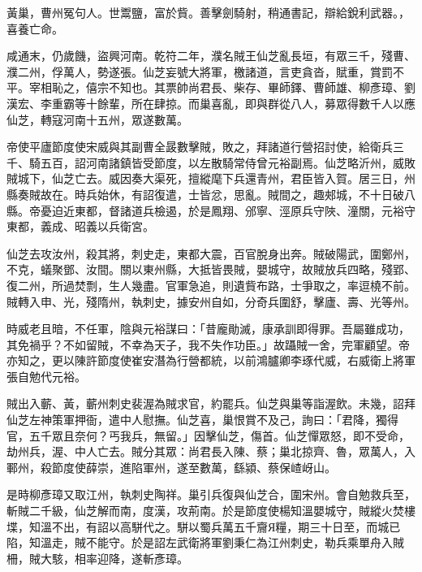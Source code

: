
\begin{pinyinscope}

 黃巢，曹州冤句人。世鬻鹽，富於貲。善擊劍騎射，稍通書記，辯給銳利武器。，喜養亡命。



 咸通末，仍歲饑，盜興河南。乾符二年，濮名賊王仙芝亂長垣，有眾三千，殘曹、濮二州，俘萬人，勢遂張。仙芝妄號大將軍，檄諸道，言吏貪沓，賦重，賞罰不平。宰相恥之，僖宗不知也。其票帥尚君長、柴存、畢師鐸、曹師雄、柳彥璋、劉漢宏、李重霸等十餘輩，所在肆掠。而巢喜亂，即與群從八人，募眾得數千人以應仙芝，轉寇河南十五州，眾遂數萬。



 帝使平廬節度使宋威與其副曹全晸數擊賊，敗之，拜諸道行營招討使，給衛兵三千、騎五百，詔河南諸鎮皆受節度，以左散騎常侍曾元裕副焉。仙芝略沂州，威敗賊城下，仙芝亡去。威因奏大渠死，擅縱麾下兵還青州，君臣皆入賀。居三日，州縣奏賊故在。時兵始休，有詔復遣，士皆忿，思亂。賊間之，趣郟城，不十日破八縣。帝憂迫近東都，督諸道兵檢遏，於是鳳翔、邠寧、涇原兵守陜、潼關，元裕守東都，義成、昭義以兵衛宮。



 仙芝去攻汝州，殺其將，刺史走，東都大震，百官脫身出奔。賊破陽武，圍鄭州，不克，蟻聚鄧、汝間。關以東州縣，大抵皆畏賊，嬰城守，故賊放兵四略，殘郢、復二州，所過焚剽，生人幾盡。官軍急追，則遺貲布路，士爭取之，率逗橈不前。賊轉入申、光，殘隋州，執刺史，據安州自如，分奇兵圍舒，擊廬、壽、光等州。



 時威老且暗，不任軍，陰與元裕謀曰：「昔龐勛滅，康承訓即得罪。吾屬雖成功，其免禍乎？不如留賊，不幸為天子，我不失作功臣。」故躡賊一舍，完軍顧望。帝亦知之，更以陳許節度使崔安潛為行營都統，以前鴻臚卿李琢代威，右威衛上將軍張自勉代元裕。



 賊出入蘄、黃，蘄州刺史裴渥為賊求官，約罷兵。仙芝與巢等詣渥飲。未幾，詔拜仙芝左神策軍押衙，遣中人慰撫。仙芝喜，巢恨賞不及己，詢曰：「君降，獨得官，五千眾且奈何？丐我兵，無留。」因擊仙芝，傷首。仙芝憚眾怒，即不受命，劫州兵，渥、中人亡去。賊分其眾：尚君長入陳、蔡；巢北掠齊、魯，眾萬人，入鄆州，殺節度使薛崇，進陷軍州，遂至數萬，繇潁、蔡保嵖岈山。



 是時柳彥璋又取江州，執刺史陶祥。巢引兵復與仙芝合，圍宋州。會自勉救兵至，斬賊二千級，仙芝解而南，度漢，攻荊南。於是節度使楊知溫嬰城守，賊縱火焚樓堞，知溫不出，有詔以高駢代之。駢以蜀兵萬五千齎Я糧，期三十日至，而城已陷，知溫走，賊不能守。於是詔左武衛將軍劉秉仁為江州刺史，勒兵乘單舟入賊柵，賊大駭，相率迎降，遂斬彥璋。




\end{pinyinscope}
